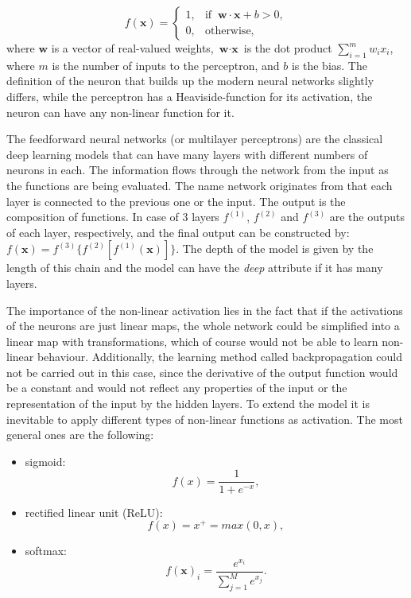 \documentclass[12pt]{article}
\theoremstyle{plain}
\begin{document}
\begin{equation}
f(\mathbf{x}) = \begin{cases}1, & \text{if }\ \mathbf{w} \cdot \mathbf{x} + b > 0,\\0, & \text{otherwise,}\end{cases}
\end{equation}
where $\textbf{w}$ is a vector of real-valued weights, $\textbf{w} \cdot \textbf{x}$ is the dot product $\sum_{i=1}^m w_i x_i$, where $m$ is the number of inputs to the perceptron, and $b$ is the bias. The definition of the neuron that builds up the modern neural networks slightly differs, while the perceptron has a Heaviside-function for its activation, the neuron can have any non-linear function for it.

The feedforward neural networks (or multilayer perceptrons) are the classical deep learning models that can have many layers with different numbers of neurons in each. The information flows through the network from the input as the functions are being evaluated. The name network originates from that each layer is connected to the previous one or the input. The output is the composition of functions. In case of 3 layers $f^{(1)}$, $f^{(2)}$ and $f^{(3)}$ are the outputs of each layer, respectively, and the final output can be constructed by: $f(\textbf{x}) =  f^{(3)}\{f^{(2)}[f^{(1)}(\textbf{x})]\}$. The depth of the model is given by the length of this chain and the model can have the \textit{deep} attribute if it has many layers.

The importance of the non-linear activation lies in the fact that if the activations of the neurons are just linear maps, the whole network could be simplified into a linear map with transformations, which of course would not be able to learn non-linear behaviour. Additionally, the learning method called backpropagation could not be carried out in this case, since the derivative of the output function would be a constant and would not reflect any properties of the input or the representation of the input by the hidden layers. To extend the model it is inevitable to apply different types of non-linear functions as activation. The most general ones are the following:

\begin{itemize}
	\item sigmoid: 
	\begin{equation}
	f(x) = \frac{1}{1 + e^{-x}},
	\end{equation}		
	\item rectified linear unit (ReLU):
	\begin{equation}
	f(x) = x^+ = max(0,x),
	\end{equation}
	\item softmax:
	\begin{equation}
	f(\mathbf{x})_i = \frac{e^{x_i}}{\sum_{j=1}^M e^{x_j}}.
	\end{equation}
\end{itemize}
\end{document}
